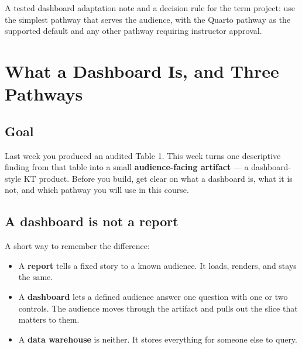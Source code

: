\documentclass[
  letterpaper,
  DIV=11,
  numbers=noendperiod,
  oneside]{scrreprt}
\providecommand{\tightlist}{%
  \setlength{\itemsep}{0pt}\setlength{\parskip}{0pt}}
\begin{document}

A tested dashboard adaptation note and a decision rule for the term
project: use the simplest pathway that serves the audience, with the
Quarto pathway as the supported default and any other pathway requiring
instructor approval.

\chapter*{What a Dashboard Is, and Three
Pathways}\label{what-a-dashboard-is-and-three-pathways}


\section*{Goal}\label{goal-7}


Last week you produced an audited Table 1. This week turns one
descriptive finding from that table into a small \textbf{audience-facing
artifact} --- a dashboard-style KT product. Before you build, get clear
on what a dashboard is, what it is not, and which pathway you will use
in this course.

\section*{A dashboard is not a
report}\label{a-dashboard-is-not-a-report}


A short way to remember the difference:

\begin{itemize}
\tightlist
\item
  A \textbf{report} tells a fixed story to a known audience. It loads,
  renders, and stays the same.
\item
  A \textbf{dashboard} lets a defined audience answer one question with
  one or two controls. The audience moves through the artifact and pulls
  out the slice that matters to them.
\item
  A \textbf{data warehouse} is neither. It stores everything for someone
  else to query.
\end{itemize}
\end{document}
